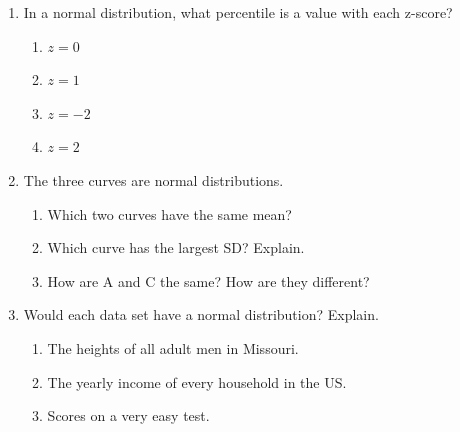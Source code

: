 \documentclass[11pt]{article}
\begin{document}
\begin{enumerate}
\begin{enumerate}[itemsep=1.6em]
\end{enumerate}
\work{1.5em}

\newpage
\item In a normal distribution, what percentile is a value with each z-score?
\begin{enumerate}[itemsep=1.6em]
  \item $z = 0$ 
  \item $z = 1$ 
  \item $z = -2$ 
  \item $z = 2$ 
\end{enumerate}
\work{1.5em}

\item The three curves are normal distributions.
\begin{center}\end{center}
\begin{enumerate}[itemsep=\ifkey 1.6em\else 3em\fi]
  \item Which two curves have the same mean? 
  \item Which curve has the largest SD? Explain. 
  \item How are A and C the same? How are they different?

\end{enumerate}
\work{1.5em}

\item Would each data set have a normal distribution? Explain.
\begin{enumerate}[itemsep=\ifkey 2.2em\else 3.5em\fi]
  \item The heights of all adult men in Missouri. 
  \item The yearly income of every household in the US. 
  \item Scores on a very easy test. 
\end{enumerate}

\end{enumerate}
\end{document}
